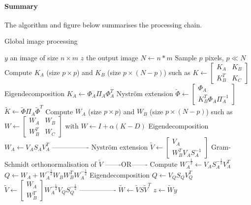 \paragraph{Summary}

The algorithm and figure below summarises the processing chain.

\begin{algorithm}[H]
 \caption{Global image processing}
 \begin{algorithmic}
  \REQUIRE \(y\) an image of size \(n \times m\)
  \ENSURE \(z\) the output image
  \STATE \(N \leftarrow n*m\)
  \STATE Sample \(p\) pixels, \(p \ll N\)
  \STATE {}
  \STATE Compute \(K_A\) (size \(p \times p\)) and \(K_B\) (size \(p \times (N-p)\)) such as \(K \leftarrow \begin{bmatrix} K_A & K_B \\ K_B^T & K_C \end{bmatrix}\)
  \STATE Eigendecomposition \(K_A \leftarrow \Phi_A \Pi_A \Phi_A^T\)
  \STATE Nystr\"om extension \(\tilde{\Phi} \leftarrow \begin{bmatrix} \Phi_A \\ K_B^T \Phi_A \Pi_A^{-1} \end{bmatrix}\)
  \STATE \(\tilde{K} \leftarrow \tilde{\Phi} \Pi_A \tilde{\Phi}^T\)
  \STATE {}
  \STATE Compute \(W_A\) (size \(p \times p\)) and \(W_B\) (size \(p \times (N-p)\)) such as \(W \leftarrow \begin{bmatrix} W_A & W_B \\ W_B^T & W_C \end{bmatrix}\) with \(W \leftarrow I + \alpha(K-D)\)
  \STATE Eigendecomposition \(W_A \leftarrow V_A S_A V_A^T\)
  \STATE ----------------
  \STATE Nystr\"om extension \(\tilde{V} \leftarrow \begin{bmatrix} V_A \\ W_B^T V_A S_A^{-1} \end{bmatrix}\)
  \STATE Gram-Schmidt orthonormalisation of \(\tilde{V}\)
  \STATE -------OR-------
  \STATE Compute \(W_A^{-\frac{1}{2}} \leftarrow V_A S_A^{-\frac{1}{2}} V_A^T\)
  \STATE \(Q \leftarrow W_A + W_A^{-\frac{1}{2}} W_B W_B^T W_A^{-\frac{1}{2}}\)
  \STATE Eigendecomposition \(Q \leftarrow V_Q S_Q V_Q^T\)
  \STATE \(\tilde{V} \leftarrow \begin{bmatrix} W_A \\ W_B^T \end{bmatrix} W_A^{-\frac{1}{2}} V_Q S_Q^{-\frac{1}{2}}\)
  \STATE ----------------
  \STATE \(\tilde{W} \leftarrow \tilde{V} S \tilde{V}^T\)
  \STATE \(z \leftarrow \tilde{W}y\)
 \end{algorithmic}
\end{algorithm}

